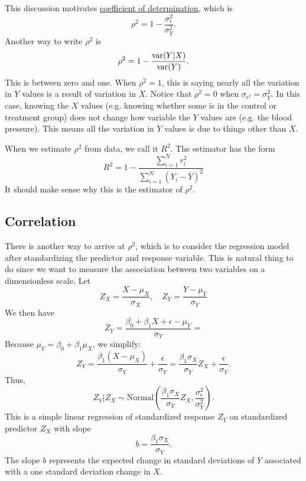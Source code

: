 This discussion motivates \underline{coefficient of determination}, which is 
\begin{equation}
\rho^2 = 1 - \frac{\sigma_{\epsilon}^2}{\sigma_Y^2}. 
\end{equation}
Another way to write $\rho^2$ is
\begin{equation}
\rho^2 = 1 - \frac{{\rm var}(Y|X)}{{\rm var}(Y)}. 
\end{equation}
This is between zero and one. When $\rho^2=1$, this is saying nearly all the variation in $Y$ values is a result of variation in $X$. Notice that $\rho^2 = 0$ when $\sigma_{\epsilon^2} = \sigma_Y^2$. In this case, knowing the $X$ values (e.g. knowing whether some is in the control or treatment group) does not change how variable the $Y$ values are (e.g. the blood pressure). This means all the variation in $Y$ values is due to things other than $X$.  

When we estimate $\rho^2$ from data, we call it $R^2$. The estimator has the form
\begin{equation}
R^2 = 1 - \frac{\sum_{i=1}^Nr_i^2}{\sum_{i=1}^N(Y_i - \overline{Y})^2}
\end{equation}
It should make sense why this is the estimator of $\rho^2$. 

\subsection{Correlation}
There is another way to arrive at $\rho^2$, which is to consider the regression model after standardizing the predictor and response variable. This is natural thing to do since we want to measure the association between two variables on a dimensionless scale. Let 
\begin{equation}
Z_ X = \frac{X- \mu_X}{\sigma_X},\quad Z_ Y = \frac{Y- \mu_Y}{\sigma_Y}
\end{equation} 
We then have
\begin{equation}
Z_ Y = \frac{\beta_0 + \beta_1 X + \epsilon - \mu_Y}{\sigma_Y} = 
\end{equation}
Because \(\mu_Y = \beta_0 + \beta_1 \mu_X\), we simplify:
\[
Z_Y = \frac{\beta_1 (X - \mu_X)}{\sigma_Y} + \frac{\epsilon}{\sigma_Y} = \frac{\beta_1 \sigma_X}{\sigma_Y} Z_X + \frac{\epsilon}{\sigma_Y}.
\]
Thus,
\[
Z_Y \big| Z_X \sim \text{Normal}\left( \frac{\beta_1 \sigma_X}{\sigma_Y} Z_X, \frac{\sigma_\epsilon^2}{\sigma_Y^2} \right).
\]
This is a simple linear regression of standardized response \(Z_Y\) on standardized predictor \(Z_X\) with slope 
\[
b = \frac{\beta_1 \sigma_X}{\sigma_Y}.
\]
 The slope \(b\) represents the expected change in standard deviations of \(Y\) associated with a one standard deviation change in \(X\).


